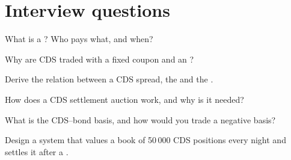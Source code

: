 \section{Interview questions}

\begin{interviewq}\label{iq:m2:credit-default-swaps:1}
What is a ? Who pays what, and when?
\end{interviewq}

\begin{interviewq}\label{iq:m2:credit-default-swaps:2}
Why are CDS traded with a fixed coupon and an ?
\end{interviewq}

\begin{interviewq}\label{iq:m2:credit-default-swaps:3}
Derive the relation between a CDS spread, the  and the .
\end{interviewq}

\begin{interviewq}\label{iq:m2:credit-default-swaps:4}
How does a CDS settlement auction work, and why is it needed?
\end{interviewq}

\begin{interviewq}\label{iq:m2:credit-default-swaps:5}
What is the CDS--bond basis, and how would you trade a negative basis?
\end{interviewq}

\begin{interviewq}\label{iq:m2:credit-default-swaps:6}
Design a system that values a book of 50\,000 CDS positions every night and settles it
after a .
\end{interviewq}
